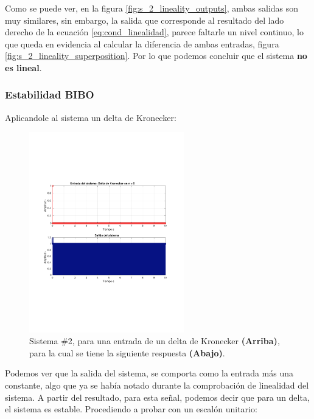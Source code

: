 			Como se puede ver, en la figura \ref{fig:s_2_lineality_outputs}, ambas salidas son muy similares, sin embargo, la salida que corresponde al resultado del lado derecho de la ecuación \ref{eq:cond_linealidad}, parece faltarle un nivel continuo, lo que queda en evidencia al calcular la diferencia de ambas entradas, figura \ref{fig:s_2_lineality_superposition}. Por lo que podemos concluir que el sistema \textbf{no es lineal}.
		
		\subsubsection{Estabilidad BIBO}
			Aplicandole al sistema un delta de Kronecker:
		
			\begin{figure}[H]
				\center
				\includegraphics[width=0.6\textwidth,clip, trim = {2cm 7.0cm 2.2cm 7.0cm}]{../imgs/sistema_2_bibo_n_0.pdf}
				\caption{Sistema \#2, para una entrada de un delta de Kronecker \textbf{(Arriba)}, para la cual se tiene la siguiente respuesta \textbf{(Abajo)}.}
				\label{fig:s_2_bibo_n_0}
			\end{figure}
		
			Podemos ver que la salida del sistema, se comporta como la entrada más una constante, algo que ya se había notado durante la comprobación de linealidad del sistema. A partir del resultado, para esta señal, podemos decir que para un delta, el sistema es estable. Procediendo a probar con un escalón unitario:
		
